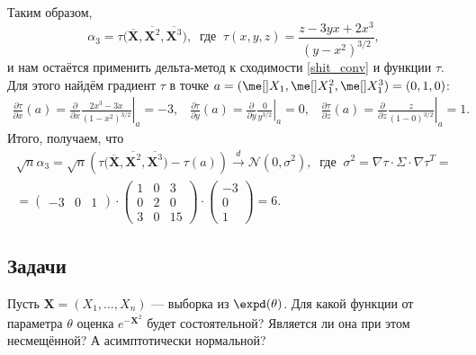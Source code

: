 \begin{example}
\[    \]
    Таким образом,
    \[
    \alpha_3 = \tau\bigl(\overline{\mathbf X}, \overline{\mathbf X^2}, \overline{\mathbf X^3}\bigr),\;\;\text{где}\;\;\tau(x, y, z) = \frac{z - 3yx + 2x^3}{(y - x^2)^{3/2}},
    \]
    и нам остаётся применить дельта-метод к сходимости \eqref{shit_conv} и функции $\tau$. Для этого найдём градиент $\tau$ в точке $a = (\me[] X_1, \me[] X_1^2, \me[] X_1^3) = (0, 1, 0)$:
    \begin{gather*}
        \frac{\partial \tau}{\partial x}(a) = \frac{\partial}{\partial x} \left.\frac{2x^3-3x}{(1-x^2)^{3/2}}\right|_{a} = -3,\;\;\;\frac{\partial \tau}{\partial y}(a) = \frac{\partial}{\partial y} \left.\frac{0}{y^{3/2}}\right|_{a} = 0,\;\;\;\frac{\partial \tau}{\partial z}(a) = \frac{\partial}{\partial z} \left.\frac{z}{(1-0)^{3/2}}\right|_{a} = 1.
    \end{gather*}
    Итого, получаем, что
    \begin{gather*}
        \sqrt{n} \alpha_3 = 
    \sqrt{n}\left(
    \tau\bigl(\overline{\mathbf X}, \overline{\mathbf X^2}, \overline{\mathbf X^3}\bigr)
    -
    \tau(a)
    \right)
    \stackrel{d}{\longrightarrow} \mathcal{N}(0, \sigma^2), \;\;\text{где}\;\;\sigma^2 = \nabla\tau \cdot \Sigma \cdot \nabla\tau^T = \\
    = \begin{pmatrix}
        -3 & 0 & 1
    \end{pmatrix} \cdot 
    \begin{pmatrix}
        1 & 0 & 3\\
        0 & 2 & 0\\
        3 & 0 & 15
    \end{pmatrix}\cdot 
    \begin{pmatrix}
        -3\\
        0\\
        1
    \end{pmatrix} = 6.
    \end{gather*}
\end{example}

\subsection*{Задачи}

\begin{problem}
	Пусть $\mathbf X = (X_1, \ldots, X_n)$ --- выборка из $\expd(\theta)$. Для какой функции от параметра $\theta$ оценка $e^{-\overline{\mathbf X^2}}$ будет состоятельной? Является ли она при этом несмещённой? А асимптотически нормальной?
\end{problem}

